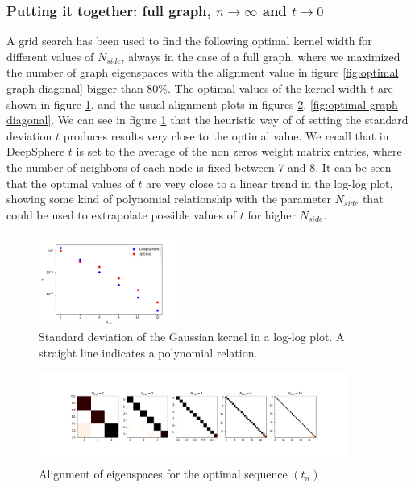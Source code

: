 \subsubsection{Putting it together: full graph, $n\to\infty$ and $t\to 0$}
A grid search has been used to find the following optimal kernel width for different values of $N_{side}$, always in the case of a full graph, where we maximized the number of graph eigenspaces with the alignment value in figure \ref{fig:optimal graph diagonal} bigger than $80\%$. The optimal values of the kernel width $t$ are shown in figure \ref{fig:t}, and the usual alignment plots in figures \ref{fig:optimal graph}, \ref{fig:optimal graph diagonal}. We can see in figure \ref{fig:t} that the heuristic way of \cite{DeepSphere} of setting the standard deviation $t$ produces results very close to the optimal value. We recall that in DeepSphere $t$ is set to the average of the non zeros weight matrix entries, where the number of neighbors of each node is fixed between 7 and 8. It can be seen that the optimal values of $t$ are very close to a linear trend in the log-log plot, showing some kind of polynomial relationship with the parameter $N_{side}$ that could be used to extrapolate possible values of $t$ for higher $N_{side}$.
\begin{figure}[h]
	\centering
	\includegraphics[width=0.4\textwidth]{../codes/02.HeatKernelGraphLaplacian/HEALPix/06_figures/kernelwidth.png}
\caption{\label{fig:t}Standard deviation of the Gaussian kernel  in a log-log plot. A straight line indicates a polynomial relation.}
\end{figure}
\begin{figure}[h]
	\centering
	\includegraphics[width=0.9\textwidth]{../codes/02.HeatKernelGraphLaplacian/HEALPix/06_figures/optimal_full.png}	
\caption{\label{fig:optimal graph}Alignment of eigenspaces for the optimal sequence $(t_n)$}
\end{figure}
